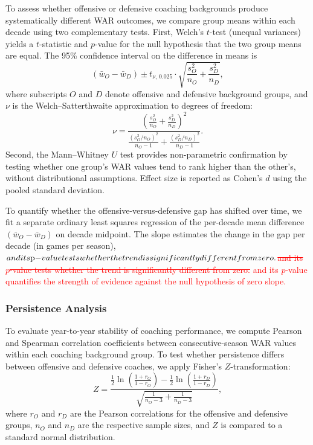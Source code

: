 \documentclass[USenglish]{article}
\newcommand{\rev}[1]{\textcolor{red}{#1}}
\newcommand{\del}[1]{\textcolor{red}{\ifmmode\mbox{\sout{\ensuremath{#1}}}\else\sout{#1}\fi}}
\theoremstyle{dgthm}
\theoremstyle{dgdef}
\begin{document}
To assess whether offensive or defensive coaching backgrounds produce systematically different WAR outcomes, we compare group means within each decade using two complementary tests. First, Welch's $t$-test (unequal variances) yields a $t$-statistic and $p$-value for the null hypothesis that the two group means are equal. The 95\% confidence interval on the difference in means is
\begin{equation}
(\bar{w}_O - \bar{w}_D) \pm t_{\nu,\,0.025} \cdot \sqrt{\frac{s_O^2}{n_O} + \frac{s_D^2}{n_D}},
\label{eq:welch_ci}
\end{equation}
where subscripts $O$ and $D$ denote offensive and defensive background groups, and $\nu$ is the Welch--Satterthwaite approximation to degrees of freedom:
\begin{equation}
\nu = \frac{\left(\frac{s_O^2}{n_O} + \frac{s_D^2}{n_D}\right)^2}{\frac{(s_O^2/n_O)^2}{n_O - 1} + \frac{(s_D^2/n_D)^2}{n_D - 1}}.
\label{eq:welch_df}
\end{equation}
Second, the Mann--Whitney $U$ test provides non-parametric confirmation by testing whether one group's WAR values tend to rank higher than the other's, without distributional assumptions. Effect size is reported as Cohen's $d$ using the pooled standard deviation.

To quantify whether the offensive-versus-defensive gap has shifted over time, we fit a separate ordinary least squares regression of the per-decade mean difference $(\bar{w}_O - \bar{w}_D)$ on decade midpoint. The slope estimates the change in the gap per decade (in games per season), \del{and its $p$-value tests whether the trend is significantly different from zero.} \rev{and its $p$-value quantifies the strength of evidence against the null hypothesis of zero slope.}

\subsubsection{Persistence Analysis}

To evaluate year-to-year stability of coaching performance, we compute Pearson and Spearman correlation coefficients between consecutive-season WAR values within each coaching background group. To test whether persistence differs between offensive and defensive coaches, we apply Fisher's $Z$-transformation:
\begin{equation}
Z = \frac{\tfrac{1}{2}\ln\!\left(\frac{1+r_O}{1-r_O}\right) - \tfrac{1}{2}\ln\!\left(\frac{1+r_D}{1-r_D}\right)}{\sqrt{\frac{1}{n_O - 3} + \frac{1}{n_D - 3}}},
\label{eq:fisher_z}
\end{equation}
where $r_O$ and $r_D$ are the Pearson correlations for the offensive and defensive groups, $n_O$ and $n_D$ are the respective sample sizes, and $Z$ is compared to a standard normal distribution.
\end{document}
